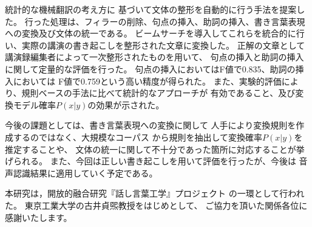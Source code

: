 統計的な機械翻訳の考え方に
基づいて文体の整形を自動的に行う手法を提案した。
行った処理は、フィラーの削除、句点の挿入、助詞の挿入、書き言葉表現への変換及び文体の統一である。
ビームサーチを導入してこれらを統合的に行い、実際の講演の書き起こしを整形された文章に変換した。
正解の文章として講演録編集者によって一次整形されたものを用いて、
句点の挿入と助詞の挿入に関して定量的な評価を行った。
句点の挿入においてはF値で0.835、助詞の挿入においては
F値で0.759という高い精度が得られた。
また、実験的評価により、規則ベースの手法に比べて統計的なアプローチが
有効であること、及び変換モデル確率$P(x|y)$の効果が示された。

今後の課題としては、書き言葉表現への変換に関して
人手により変換規則を作成するのではなく、大規模なコーパス
から規則を抽出して変換確率$P(x|y)$を推定することや、
文体の統一に関して不十分であった箇所に対応することが挙げられる。
また、今回は正しい書き起こしを用いて評価を行ったが、今後は
音声認識結果に適用していく予定である。


\vspace{5.0mm}
\acknowledgment

本研究は，開放的融合研究『話し言葉工学』プロジェクト
の一環として行われた。
東京工業大学の古井貞煕教授をはじめとして、
ご協力を頂いた関係各位に感謝いたします。


